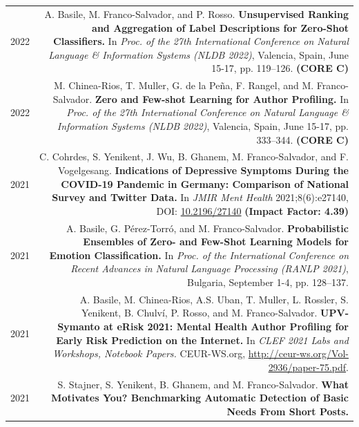 \documentclass[10pt]{article}
\begin{document}
\section*{}
\begin{tabular}{L!{\VRule}R}	
    2022 & A. Basile, M. Franco-Salvador, and P. Rosso. \textbf{Unsupervised Ranking and Aggregation of Label Descriptions for Zero-Shot Classifiers.}
	In \emph{Proc. of the 27th International Conference on Natural Language \& Information Systems (NLDB 2022)}, Valencia, Spain, June 15-17, pp. 119--126. \textbf{(CORE C)} \vspace{5pt}\\
	2022 & M. Chinea-Rios, T. Muller, G. de la Pe\~{n}a, F. Rangel, and M. Franco-Salvador. \textbf{Zero and Few-shot Learning for Author Profiling.}
	In \emph{Proc. of the 27th International Conference on Natural Language \& Information Systems (NLDB 2022)}, Valencia, Spain, June 15-17, pp. 333--344. \textbf{(CORE C)} \vspace{5pt}\\
    2021 & C. Cohrdes, S. Yenikent, J. Wu, B. Ghanem, M. Franco-Salvador, and F. Vogelgesang. \textbf{Indications of Depressive Symptoms During the COVID-19 Pandemic in Germany: Comparison of National Survey and Twitter Data.}
	In \emph{JMIR Ment Health} 2021;8(6):e27140, DOI: \href{https://doi.org/10.2196/27140}{10.2196/27140} \textbf{(Impact Factor: 4.39)} \vspace{5pt}\\
	2021 & A. Basile, G. P{\'e}rez-Torr{\'o}, and M. Franco-Salvador. \textbf{Probabilistic Ensembles of Zero- and Few-Shot Learning Models for Emotion Classification.}
	In \emph{Proc. of the International Conference on Recent Advances in Natural Language Processing (RANLP 2021)}, Bulgaria, September 1-4, pp. 128--137. \vspace{5pt}\\
	2021 & A. Basile, M. Chinea-Rios, A.S. Uban, T. Muller, L. Rossler, S. Yenikent, B. Chulv{\'i}, P. Rosso, and M. Franco-Salvador. \textbf{UPV-Symanto at eRisk 2021: Mental Health Author Profiling for Early Risk Prediction on the Internet.}
	In \emph{CLEF 2021 Labs and Workshops, Notebook Papers.} CEUR-WS.org, \href{http://ceur-ws.org/Vol-2936/paper-75.pdf}{http://ceur-ws.org/Vol-2936/paper-75.pdf}. \vspace{5pt}\\
	2021 & S. Stajner, S. Yenikent, B. Ghanem, and M. Franco-Salvador. \textbf{What Motivates You? Benchmarking Automatic Detection of Basic Needs From Short Posts.}

\end{tabular}
\end{document}

